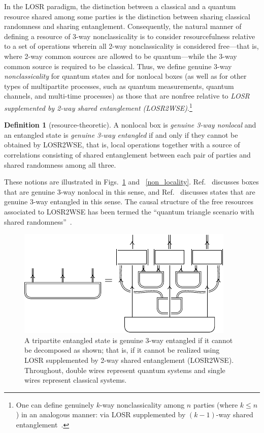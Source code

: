 \documentclass[12pt]{article}
\theoremstyle{plain}
\theoremstyle{definition}
\newtheorem{defn}{Definition}
\begin{document}
In the LOSR paradigm, the distinction between a classical and a quantum resource shared among some parties is the distinction between sharing classical randomness and sharing entanglement.  
Consequently, the natural manner of defining a resource of 3-way nonclassicality is to consider resourcefulness relative to a set of operations wherein all 2-way nonclassicality is considered free---that is, where 2-way common sources are allowed to be quantum---while the 3-way common source is required to be classical. 
Thus, we define genuine 3-way {\em nonclassicality} for quantum states and for nonlocal boxes (as well as for other types of multipartite processes, such as quantum measurements, quantum channels,  and multi-time processes) as those that are nonfree relative to 
  {\em LOSR supplemented by 2-way shared entanglement (LOSR2WSE)}.\footnote{One can define  genuinely $k$-way nonclassicality among $n$ parties (where $k\leq n$) in an analogous manner: via LOSR supplemented by $(k-1)$-way shared entanglement~\cite{navascues2020genuine}.}     
  \begin{defn}[resource-theoretic]\label{Defn:G3WE}
A nonlocal box is {\em genuine 3-way nonlocal} and an entangled state is {\em genuine 3-way entangled} if and only if they cannot be obtained by LOSR2WSE, that is, local operations together with a source of correlations consisting of shared entanglement between each pair of parties and shared randomness among all three. 
    \end{defn}
   These notions
    are illustrated in Figs.~\ref{genuinely3way} and ~\ref{non_locality}.
Ref.~\cite{wolfe2021infl}  discusses boxes that are genuine 3-way nonlocal in this sense, and Ref.~\cite{navascues2020genuine} discusses states that are genuine 3-way entangled in this sense. The causal structure 
of the free resources
 associated to LOSR2WSE
 has been termed the ``quantum triangle scenario with shared randomness''~\cite{wolfe2021infl,kraft2021quantum}.

\begin{figure}[htb!]
\centering
    \includegraphics[scale=1]{fig_three_way_losr.pdf}
    \caption{
       A tripartite entangled state is genuine 3-way entangled if it cannot be decomposed as shown; that is, if it cannot be realized using LOSR supplemented by 2-way shared entanglement (LOSR2WSE). 
        Throughout, double wires represent quantum systems and single wires represent classical systems. 
    }
    \label{genuinely3way}
\end{figure}
\end{document}

